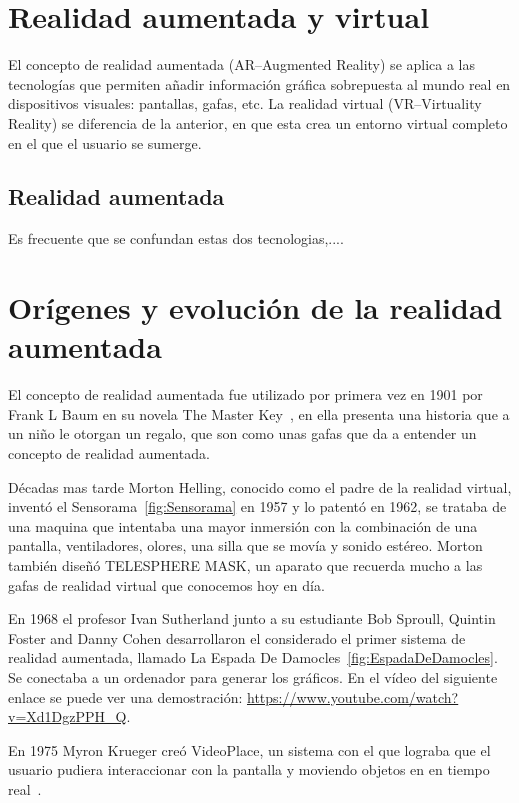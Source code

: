 

\section{Realidad aumentada y virtual}

El concepto de realidad aumentada (AR--Augmented Reality) se aplica a las tecnologías que permiten añadir información gráfica sobrepuesta al mundo real en dispositivos visuales: pantallas, gafas, etc.
La realidad virtual (VR--Virtuality Reality) se diferencia de la anterior, en que esta crea un entorno virtual completo en el que el usuario se sumerge.
\subsection{Realidad aumentada} 
Es frecuente que se confundan estas dos tecnologias,....
\section{Orígenes y evolución de la realidad aumentada}
El concepto de realidad aumentada fue utilizado por primera vez en 1901 por Frank L Baum en su novela The Master Key~\cite{theMasterKey}, en ella presenta una historia que a un niño le otorgan un regalo, que son como unas gafas que da a entender un concepto de realidad aumentada.

Décadas mas tarde Morton Helling, conocido como el padre de la realidad virtual, inventó el Sensorama~\ref{fig:Sensorama} en 1957 y lo patentó en 1962, se trataba de una maquina que intentaba una mayor inmersión con la combinación de una pantalla, ventiladores, olores, una silla que se movía y sonido estéreo. Morton también diseñó TELESPHERE MASK, un aparato que recuerda mucho a las gafas de realidad virtual que conocemos hoy en día.


En 1968 el profesor Ivan Sutherland junto a su estudiante Bob Sproull, Quintin Foster and Danny Cohen desarrollaron el considerado el primer sistema de realidad aumentada, llamado La Espada De Damocles~\ref{fig:EspadaDeDamocles}. Se conectaba a un ordenador para generar los gráficos. En el vídeo del siguiente enlace se puede ver una demostración: \url{https://www.youtube.com/watch?v=Xd1DgzPPH_Q}.


En 1975 Myron Krueger creó VideoPlace, un sistema con el que lograba que el usuario pudiera interaccionar con la pantalla y moviendo objetos en en tiempo real~\cite{ARevolution}.



